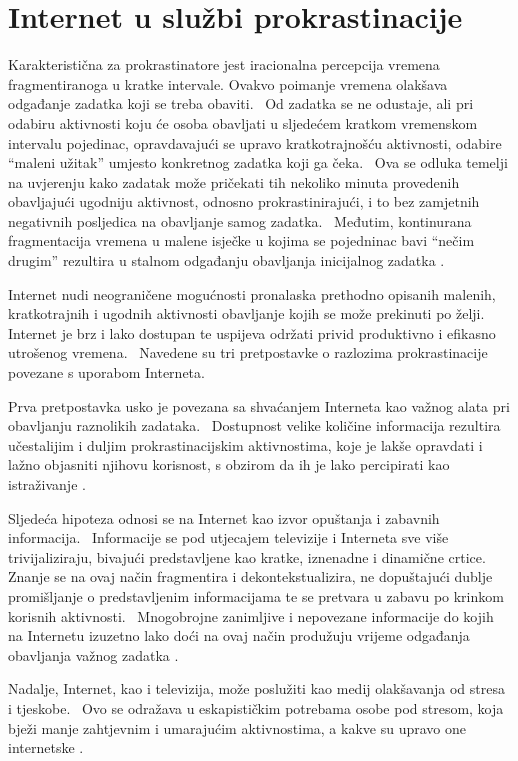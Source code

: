\documentclass[11pt,twocolumn,english]{article}
\begin{document}
\section{Internet u službi prokrastinacije}
Karakteristična za prokrastinatore jest iracionalna percepcija vremena fragmentiranoga u kratke
intervale. Ovakvo poimanje vremena olakšava odgađanje zadatka koji se treba obaviti.~ Od zadatka se
ne odustaje, ali pri odabiru aktivnosti koju će osoba obavljati u sljedećem kratkom
vremenskom intervalu pojedinac, opravdavajući se upravo kratkotrajnošću aktivnosti, odabire ``maleni užitak''
umjesto konkretnog zadatka koji ga čeka.~ Ova se odluka temelji na uvjerenju kako zadatak može pričekati
tih nekoliko minuta provedenih obavljajući ugodniju aktivnost, odnosno prokrastinirajući, i to bez
zamjetnih negativnih posljedica na obavljanje samog zadatka.~ Međutim, kontinurana fragmentacija vremena
u malene isječke u kojima se pojedninac bavi ``nečim drugim'' rezultira u stalnom odgađanju obavljanja
inicijalnog zadatka \cite{Online08thatchera}.

Internet nudi neograničene mogućnosti pronalaska prethodno opisanih malenih, kratkotrajnih i ugodnih 
aktivnosti obavljanje kojih se može prekinuti po želji.~ Internet je brz i lako dostupan te uspijeva održati 
privid produktivno i efikasno utrošenog vremena.~ Navedene su tri pretpostavke o razlozima prokrastinacije
povezane s uporabom Interneta. 

Prva pretpostavka usko je povezana sa shvaćanjem Interneta kao važnog alata pri obavljanju raznolikih 
zadataka.~ Dostupnost velike količine informacija rezultira učestalijim i duljim prokrastinacijskim 
aktivnostima, koje je lakše opravdati i lažno objasniti njihovu korisnost, s obzirom da ih je 
lako percipirati kao istraživanje \cite{Lavoie01cyberslacking}.

Sljedeća hipoteza odnosi se na Internet kao izvor opuštanja i zabavnih informacija.~ Informacije se pod utjecajem 
televizije i Interneta sve više trivijaliziraju, bivajući predstavljene kao kratke, iznenadne i 
dinamične crtice.~ Znanje se na ovaj način fragmentira i dekontekstualizira, ne dopuštajući 
dublje promišljanje o predstavljenim informacijama te se pretvara u zabavu po krinkom korisnih aktivnosti.~ 
Mnogobrojne zanimljive i nepovezane informacije do kojih na Internetu izuzetno lako doći na ovaj način 
produžuju vrijeme odgađanja obavljanja važnog zadatka \cite{Postman85amusing}.

Nadalje, Internet, kao i televizija, može poslužiti kao medij olakšavanja od stresa i tjeskobe.~ 
Ovo se odražava u eskapističkim potrebama osobe pod stresom, koja bježi manje zahtjevnim i umarajućim 
aktivnostima, a kakve su upravo one internetske \cite{Lavoie01cyberslacking}.
\end{document}
